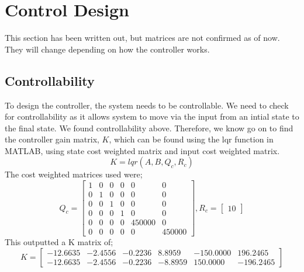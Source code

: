 \documentclass{article}
\begin{document}
\section{Control Design}
This section has been written out, but matrices are not confirmed as of now. They will change depending on how the controller works.
\subsection{Controllability}
To design the controller, the system needs to be controllable. We need to check for controllability as it allows system to move via the input from an intial state to the final state. We found controllability above. Therefore, we know go on to find the controller gain matrix, $K$, which can be found using the lqr function in MATLAB, using state cost weighted matrix and input cost weighted matrix. \\
\begin{equation}
    K = lqr(A,B,Q_{c},R_{c})
\end{equation}
The cost weighted matrices used were;
\begin{equation*}
    Q_{c} = \begin{bmatrix}
    1 & 0 & 0 & 0 & 0& 0\\
    0 & 1 & 0 & 0 & 0 & 0\\
    0 & 0 & 1 & 0 & 0 & 0\\
    0 & 0 & 0 & 1 & 0& 0\\
    0 & 0 & 0 & 0 & 450000& 0\\0&0&0&0&0&450000
    \end{bmatrix} , R_{c} = \begin{bmatrix}
    10
    \end{bmatrix}
\end{equation*}
This outputted a K matrix of;
\begin{equation}
    K = \begin{bmatrix}
-12.6635 & -2.4556 & -0.2236 & 8.8959 & -150.0000 & 196.2465\\
-12.6635 & -2.4556 & -0.2236 & -8.8959 & 150.0000 & -196.2465
    \end{bmatrix}
\end{equation}
\end{document}

